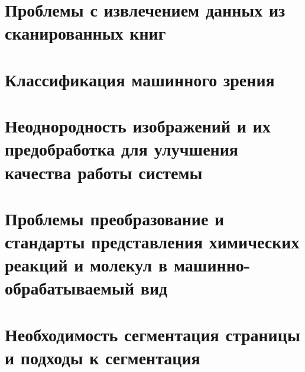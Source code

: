 
\section{Проблемы с извлечением данных из сканированных книг}


\section{Классификация машинного зрения}


\section{Неоднородность изображений и их предобработка для улучшения качества работы системы}


\section{Проблемы преобразование и стандарты представления химических реакций и молекул в машинно-обрабатываемый вид}


\section{Необходимость сегментация страницы и подходы к сегментация}



